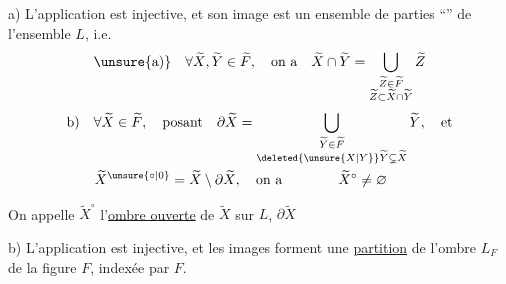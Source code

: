a) L'application
est injective, et son image  est un ensemble de parties ``'' de l'ensemble $L$, i.e.
\[
\text{\unsure{a)}}\quad\forall\widetilde X,\widetilde Y\in\widetilde F,\quad\text{on a}\quad
\widetilde X\cap\widetilde Y=\bigcup_{\substack{\widetilde Z\in\widetilde F\\ \widetilde Z\subset\widetilde X\cap\widetilde Y}}\widetilde Z
\]
\[
\begin{aligned}
&\text{b)}\quad \forall\widetilde X\in\widetilde F,\quad\text{posant}\quad
\partial\widetilde X=\bigcup_{\substack{\widetilde Y\in\widetilde F\\ \deleted{\unsure{X|Y}}\widetilde Y\subsetneq\widetilde X}}\widetilde Y,\quad\text{et}\\
&\qquad\widetilde X^{\unsure{\circ|0}}=\widetilde X\setminus\partial\widetilde X,\quad\text{on a}\qquad\qquad \widetilde X^\circ\neq\varnothing
\end{aligned}
\]

On  appelle $\widetilde X^\circ$ l'\uline{ombre ouverte} de $\widetilde X$ sur $L$, $\partial\widetilde X$  

b) L'application
est injective, et  les images forment une \uline{partition} de l'ombre $L_F$ de la figure $F$, indexée par $F$.

